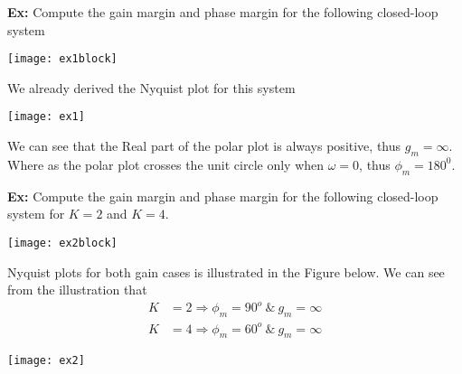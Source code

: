\documentclass[twoside]{article}
\begin{document}
\vspace{12pt}

\textbf{Ex:} Compute the gain margin and phase margin 
for the following closed-loop system 

\begin{center}
\begin{minipage}[h]{\linewidth}
    \begin{center}
      \texttt{[image: ex1block]}
    \end{center}
\end{minipage}
\end{center}

We already derived the Nyquist plot for this system

\begin{center}
\begin{minipage}[h]{\linewidth}
    \begin{center}
      \texttt{[image: ex1]}
    \end{center}
\end{minipage}
\end{center}

We can see that the Real part of the polar plot is always 
positive, thus $g_m = \infty$. Where as the polar plot crosses
the unit circle only when $\omega = 0$, thus $\phi_m = 180^0$.

\newpage

\textbf{Ex:} Compute the gain margin and phase margin 
for the following closed-loop system for $K = 2$ and $K = 4$. 

\begin{center}
\begin{minipage}[h]{\linewidth}
    \begin{center}
      \texttt{[image: ex2block]}
    \end{center}
\end{minipage}
\end{center}

Nyquist plots for both gain cases is illustrated in the Figure below.
We can see from the illustration that 
%
\begin{align*}
  K &= 2 \Rightarrow \phi_m = 90^o \ \& \ g_m = \infty
  \\
  K &= 4 \Rightarrow \phi_m = 60^o \ \& \ g_m = \infty
\end{align*}

\begin{center}
\begin{minipage}[h]{\linewidth}
    \begin{center}
      \texttt{[image: ex2]}
    \end{center}
\end{minipage}
\end{center}
\end{document}
